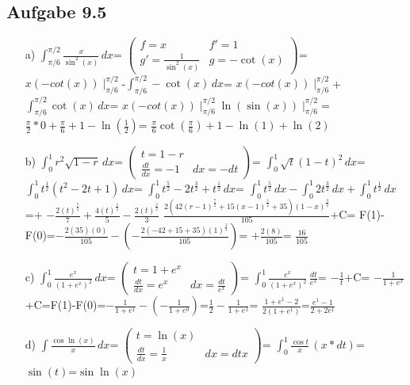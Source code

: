 \documentclass{standalone}
\begin{document}
\subsection {Aufgabe 9.5}
\begin{itemize}
    \item[a)]
    $\int_{\pi/6}^{\pi/2}\frac{x}{\sin^2(x)} \,dx$=
    $\begin{pmatrix}
    f = x & f' = 1 \\
    g' = \frac{1}{\sin^2(x)} & g = -\cot(x)
    \end{pmatrix}$=
    $x(- cot(x))\mid^{\pi/2}_{\pi/6}$-$\int_{\pi/6}^{\pi/2}-\cot(x) \,dx$=
    $x(- cot(x))\mid^{\pi/2}_{\pi/6}$+$\int_{\pi/6}^{\pi/2}\cot(x) \,dx$=
    $x(- cot(x))\mid^{\pi/2}_{\pi/6}$$\ln(\sin(x))\mid^{\pi/2}_{\pi/6}$=
    $\frac{\pi}{2}*0+\frac{\pi}{6}+1-\ln(\frac{1}{2})$=
    $\frac{\pi}{6}\cot(\frac{\pi}{6})+1-\ln(1)+\ln(2)$

    \item[b)]
    $\int_{0}^{1}r^2\sqrt{1-r} \,dx$=
    $\begin{pmatrix}
    t = 1-r & \\
        \frac{dt}{dx} = -1 & dx = -dt
        \end{pmatrix}$=
    $\int_{0}^{1}\sqrt{t}(1-t)^2 \,dx$=
    $\int_{0}^{1}t^{\frac{1}{2}}(t^2-2t+1) \,dx$=
    $\int_{0}^{1}t^{\frac{5}{2}}-2t^{\frac{3}{2}}+t^{\frac{1}{2}} \,dx$=
    $\int_{0}^{1}t^{\frac{5}{2}}\,dx-\int_{0}^{1}2t^{\frac{3}{2}}\,dx+\int_{0}^{1}t^{\frac{1}{2}} \,dx$=+
    $-\frac{2(t)^{\frac{7}{2}}}{7}+\frac{4(t)^{\frac{5}{2}}}{5}-\frac{2(t)^{\frac{3}{2}}}{3}$
    $\frac{2(42(r-1)^{\frac{7}{2}}+15(x-1)^{\frac{5}{2}}+35)(1-x)^{\frac{3}{2}}}{105}$+C=
    F(1)-F(0)=$-\frac{2(35)(0)}{105}-(-\frac{2(-42+15+35)(1)^{\frac{3}{2}}}{105})$=
    $+\frac{2(8)}{105}$= $\frac{16}{105}$
    \item[c)]
    $\int_{0}^{1}\frac{e^x}{(1+e^x)^2} \,dx$=
    $\begin{pmatrix}
        t = 1+e^x &  \\
        \frac{dt}{dx} = e^x & dx = \frac{dt}{e^x}
    \end{pmatrix}$= 
    $\int_{0}^{1}\frac{e^x}{(1+e^x)^2} \,\frac{dt}{e^x}$=
    $-\frac{1}{t}$+C=
    $-\frac{1}{1+e^x}$+C=F(1)-F(0)=$-\frac{1}{1+e^1}-(-\frac{1}{1+e^0})$=$\frac{1}{2}-\frac{1}{1+e^1}$=
    $\frac{1+e^1-2}{2(1+e^1)}$=$\frac{e^1-1}{2+2e^1}$

    \item[d)]
    $\int\frac{\cos{\ln(x)}}{x} \,dx$=
    $\begin{pmatrix}
        t = \ln(x) &  \\
        \frac{dt}{dx} = \frac{1}{x} & dx = dtx
    \end{pmatrix}$= 
    $\int_{0}^{1}\frac{\cos{t}}{x} \,(x*dt)$=
    $\sin(t)$=$\sin\ln(x)$


\end{itemize}
\end{document}
